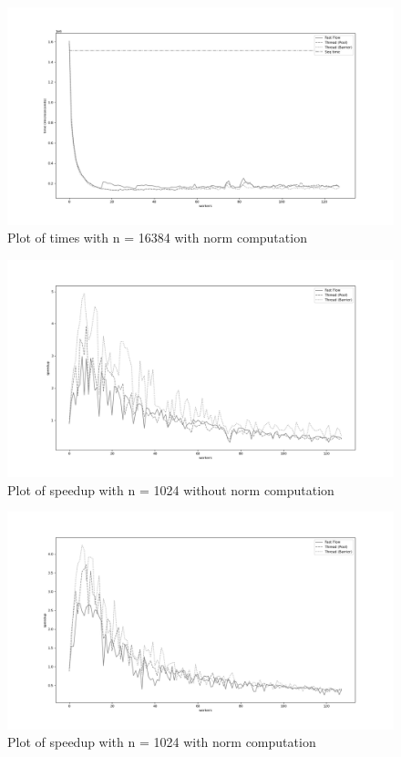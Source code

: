 \documentclass[12pt]{extarticle}
\begin{document}
\begin{figure}[H]
\centering
    \includegraphics[width=18cm, center]{./plots/times_16384_1.png}
    \caption{Plot of times with n = 16384 with norm computation}
\end{figure}


\begin{figure}[H]
\centering
    \includegraphics[width=18cm, center]{./plots/speedup_1024_0.png}
    \caption{Plot of speedup with n = 1024 without norm computation}
\end{figure}

\begin{figure}[H]
\centering
    \includegraphics[width=18cm, center]{./plots/speedup_1024_1.png}
    \caption{Plot of speedup with n = 1024 with norm computation}
\end{figure} 
\end{document}
